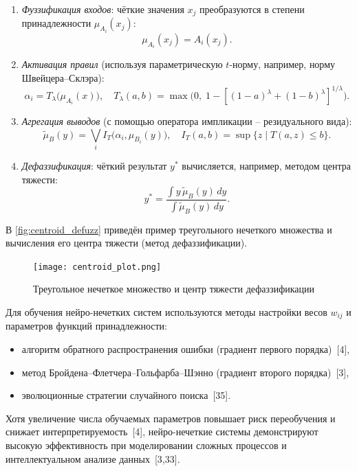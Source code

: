 \begin{enumerate}
  \item \emph{Фуззификация входов}:
    чёткие значения \(x_j\) преобразуются в степени принадлежности
    \(\mu_{A_i}(x_j)\):
    \[
      \mu_{A_i}(x_j) = A_i(x_j).
    \]
  \item \emph{Активация правил} (используя параметрическую \(t\)-норму,
    например, норму Швейцера–Склэра):
    \[
      \alpha_i
      = T_{\lambda}\bigl(\mu_{A_i}(x)\bigr),
      \quad
      T_{\lambda}(a,b)
      = \max\!\bigl(0,\;1-[(1-a)^\lambda + (1-b)^\lambda]^{1/\lambda}\bigr).
    \]
  \item \emph{Агрегация выводов} (с помощью оператора импликации –
    резидуального вида):
    \[
      \tilde{\mu}_B(y)
      = \bigvee_i I_T\bigl(\alpha_i,\mu_{B_i}(y)\bigr),
      \quad
      I_T(a,b)
      = \sup\{z\mid T(a,z)\le b\}.
    \]
  \item \emph{Дефаззификация}: чёткий результат \(y^*\) вычисляется, например,
    методом центра тяжести:
    \[
      y^*
      = \frac{\displaystyle \int y\,\tilde{\mu}_B(y)\,dy}
             {\displaystyle \int \tilde{\mu}_B(y)\,dy}.
    \]
\end{enumerate}

В \autoref{fig:centroid_defuzz} приведён пример треугольного нечеткого множества
и вычисления его центра тяжести (метод дефаззификации).

\begin{figure}[ht]
  \centering
  \texttt{[image: centroid\_plot.png]}
  \caption{Треугольное нечеткое множество и центр тяжести дефаззификации}
  \label{fig:centroid_defuzz}
\end{figure}

Для обучения нейро-нечетких систем используются методы настройки
весов \(w_{ij}\) и параметров функций принадлежности:
\begin{itemize}
  \item алгоритм обратного распространения ошибки (градиент первого порядка)~[4],
  \item метод Бройдена–Флетчера–Гольфарба–Шэнно (градиент второго порядка)~[3],
  \item эволюционные стратегии случайного поиска~[35].
\end{itemize}

Хотя увеличение числа обучаемых параметров повышает риск переобучения и
снижает интерпретируемость~[4], нейро-нечеткие системы демонстрируют высокую
эффективность при моделировании сложных процессов и интеллектуальном
анализе данных~[3,33].


